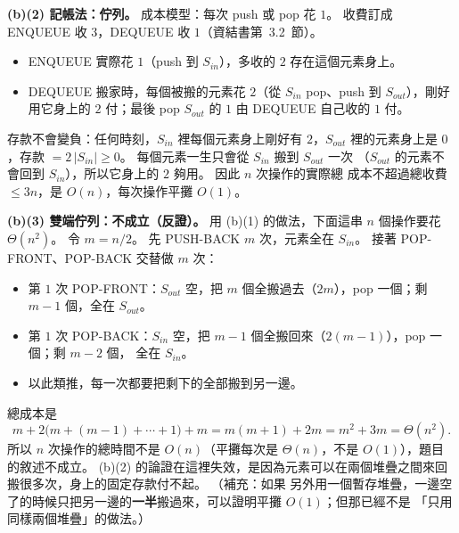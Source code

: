 \begin{pastsoln}
\textbf{(b)(2) 記帳法：佇列。} 成本模型：每次 push 或 pop 花 $1$。 收費訂成 ENQUEUE 收 $3$，DEQUEUE
收 $1$（資結書第~3.2~節）。
\begin{itemize}
\item ENQUEUE 實際花 $1$（push 到 $S_{\mathit{in}}$），多收的 $2$ 存在這個元素身上。
\item DEQUEUE 搬家時，每個被搬的元素花 $2$（從 $S_{\mathit{in}}$ pop、push 到 $S_{\mathit{out}}$），剛好
用它身上的 $2$ 付；最後 pop $S_{\mathit{out}}$ 的 $1$ 由 DEQUEUE 自己收的 $1$ 付。
\end{itemize}
存款不會變負：任何時刻，$S_{\mathit{in}}$ 裡每個元素身上剛好有 $2$，$S_{\mathit{out}}$ 裡的元素身上是
$0$，存款 $= 2\,|S_{\mathit{in}}| \ge 0$。 每個元素一生只會從 $S_{\mathit{in}}$ 搬到 $S_{\mathit{out}}$ 一次
（$S_{\mathit{out}}$ 的元素不會回到 $S_{\mathit{in}}$），所以它身上的 $2$ 夠用。 因此 $n$ 次操作的實際總
成本不超過總收費 $\le 3n$，是 $O(n)$，每次操作平攤 $O(1)$。

\textbf{(b)(3) 雙端佇列：不成立（反證）。} 用 (b)(1) 的做法，下面這串 $n$ 個操作要花 $\Theta(n^2)$。
令 $m = n/2$。 先 PUSH-BACK $m$ 次，元素全在 $S_{\mathit{in}}$。 接著 POP-FRONT、POP-BACK 交替做 $m$ 次：
\begin{itemize}
\item 第 $1$ 次 POP-FRONT：$S_{\mathit{out}}$ 空，把 $m$ 個全搬過去（$2m$），pop 一個；剩 $m - 1$ 個，全在
$S_{\mathit{out}}$。
\item 第 $1$ 次 POP-BACK：$S_{\mathit{in}}$ 空，把 $m - 1$ 個全搬回來（$2(m - 1)$），pop 一個；剩 $m - 2$ 個，
全在 $S_{\mathit{in}}$。
\item 以此類推，每一次都要把剩下的全部搬到另一邊。
\end{itemize}
總成本是
\[
m + 2\bigl(m + (m - 1) + \cdots + 1\bigr) + m = m(m + 1) + 2m = m^2 + 3m = \Theta(n^2).
\]
所以 $n$ 次操作的總時間不是 $O(n)$（平攤每次是 $\Theta(n)$，不是 $O(1)$），題目的敘述不成立。 (b)(2)
的論證在這裡失效，是因為元素可以在兩個堆疊之間來回搬很多次，身上的固定存款付不起。 （補充：如果
另外用一個暫存堆疊，一邊空了的時候只把另一邊的\textbf{一半}搬過來，可以證明平攤 $O(1)$；但那已經不是
「只用同樣兩個堆疊」的做法。）
\end{pastsoln}
